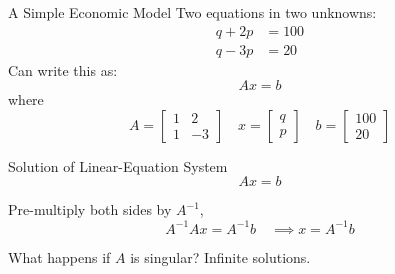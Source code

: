 \documentclass{./../../Latex/teaching_slides}
\begin{document}
\begin{frame}{A Simple Economic Model}
Two equations in two unknowns:
\begin{align*}
q + 2p &= 100 \\ q-3p &= 20
\end{align*}
Can write this as:
$$ Ax = b $$
where
$$A = \begin{bmatrix}
1 & 2 \\
1 & -3 
\end{bmatrix} \quad 
x = \begin{bmatrix}
q \\
p 
\end{bmatrix} \quad 
b = \begin{bmatrix}
100 \\
20 
\end{bmatrix}$$
\end{frame}

\begin{frame}{Solution of Linear-Equation System}
$$ Ax = b $$

\vspace{0.5em}
Pre-multiply both sides by $A^{-1}$, 
$$ A^{-1} Ax = A^{-1} b \quad \implies x = A^{-1} b $$

What happens if $A$ is singular? Infinite solutions.
\end{frame}

\end{document}
